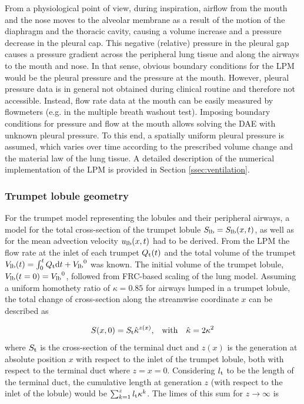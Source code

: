 From a physiological point of view, during inspiration, airflow from the mouth and the nose moves to the alveolar membrane as a result of the motion of the diaphragm and the thoracic cavity, causing a volume increase and a pressure decrease in the pleural cap.
This negative (relative) pressure in the pleural gap causes a pressure gradient across the peripheral lung tissue and along the airways to the mouth and nose.
In that sense, obvious boundary conditions for the LPM would be the pleural pressure and the pressure at the mouth. However, pleural pressure data is in general not obtained during clinical routine and therefore not accessible.
Instead, flow rate data at the mouth can be easily measured by flowmeters (e.g. in the multiple breath washout test).
Imposing boundary conditions for pressure and flow at the mouth allows solving the DAE with unknown pleural pressure.
To this end, a spatially uniform pleural pressure is assumed, which varies over time according to the prescribed volume change and the material law of the lung tissue.
A detailed description of the numerical implementation of the LPM is provided in Section \ref{ssec:ventilation}.


\subsubsection{Trumpet lobule geometry} \label{ssec:trumpet_lobule_geometry}
For the trumpet model representing the lobules and their peripheral airways, a model for the total cross-section of the trumpet lobule $S_{\mathrm{lb}} = S_{\mathrm{lb}}(x,t)$, as well as for the mean advection velocity $u_{\mathrm{lb}}(x,t)$ had to be derived.
From the LPM the flow rate at the inlet of each trumpet $Q_{\mathrm{t}}(t)$ and the total volume of the trumpet $V_{\mathrm{lb}}(t) = \int_0^t Q_{\mathrm{t}}\mathrm{d} t + {V_{\mathrm{lb}}}^0$ was known.
The initial volume of the trumpet lobule, $V_{\mathrm{lb}}(t=0) = {V_{\mathrm{lb}}}^0$, followed from FRC-based scaling of the lung model.
Assuming a uniform homothety ratio of $\kappa = 0.85$ \cite{Weibel1963} for airways lumped in a trumpet lobule, the total change of cross-section along the streamwise coordinate $x$ can be described as

\begin{equation}\label{eqn:crosssection}
S(x,0) = S_{\mathrm{t}}\hat{\kappa}^{z(x)}\text{,} \quad\text{with}\quad \hat{\kappa} = 2\kappa^2
\end{equation}
where $S_{\mathrm{t}}$ is the cross-section of the terminal duct and $z(x)$ is the generation at absolute position $x$ with respect to the inlet of the trumpet lobule, both with respect to the terminal duct where $z = x = 0$.
Considering $l_{\mathrm{t}}$ to be the length of the terminal duct, the cumulative length at generation $z$ (with respect to the inlet of the lobule) would be $\sum_{k=1}^z l_{\mathrm{t}}\kappa^k$.
The limes of this sum for $z\rightarrow\infty$ is

